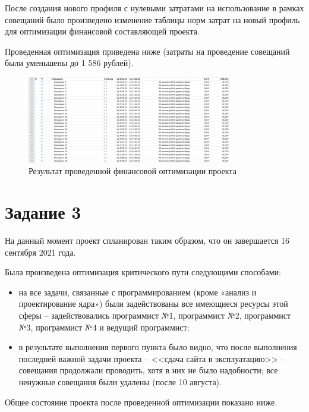 После создания нового профиля с нулевыми затратами на использование в рамках совещаний было произведено изменение таблицы норм затрат на новый профиль для оптимизации финансовой составляющей проекта.

Проведенная оптимизация приведена ниже (затраты на проведение совещаний были уменьшены до 1 586 рублей).

\begin{figure}[H]
    \centering
    \includegraphics[width=0.8\textwidth]{img/content/task_2_meetings.png}
    \caption{Результат проведенной финансовой оптимизации проекта}
    \label{fig:task_2_meetings}
\end{figure}

\section{Задание 3}

На данный момент проект спланирован таким образом, что он завершается 16 сентября 2021 года.

Была произведена оптимизация критического пути следующими способами:

\begin{itemize}
    \item на все задачи, связанные с программированием (кроме «анализ и проектирование ядра») были задействованы все имеющиеся ресурсы этой сферы – задействовались программист №1, программист №2, программист №3, программист №4 и ведущий программист;
    \item в результате выполнения первого пункта было видно, что после выполнения последней важной задачи проекта – <<сдача сайта в эксплуатацию>> – совещания продолжали проводить, хотя в них не было надобности; все ненужные совещания были удалены (после 10 августа).
\end{itemize}

Общее состояние проекта после проведенной оптимизации показано ниже.

